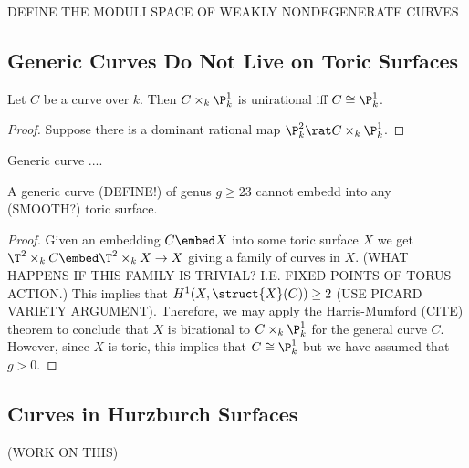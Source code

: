 \documentclass[12pt]{article}
\begin{document}
DEFINE THE MODULI SPACE OF WEAKLY NONDEGENERATE CURVES

\subsection{Generic Curves Do Not Live on Toric Surfaces}

\begin{lemma}
Let $C$ be a curve over $k$. Then $C \times_k \P^1_k$ is unirational iff $C \cong \P^1_k$.
\end{lemma}

\begin{proof}
Suppose there is a dominant rational map $\P^2_k \rat C \times_k \P^1_k$. 
\end{proof}

\begin{theorem}
Generic curve .... 
\end{theorem}

\begin{theorem}
A generic curve (DEFINE!) of genus $g \ge 23$ cannot embedd into any (SMOOTH?) toric surface. 
\end{theorem}

\begin{proof}
Given an embedding $C \embed X$ into some toric surface $X$ we get $\T^2 \times_k C \embed \T^2  \times_k X \to X$ giving a family of curves in $X$. (WHAT HAPPENS IF THIS FAMILY IS TRIVIAL? I.E. FIXED POINTS OF TORUS ACTION.) 
This implies that $H^1(X, \struct{X}(C)) \ge 2$ (USE PICARD VARIETY ARGUMENT). Therefore, we may apply the Harris-Mumford (CITE) theorem to conclude that $X$ is birational to $C \times_k \P^1_k$ for the general curve $C$. However, since $X$ is toric, this implies that $C \cong \P^1_k$ but we have assumed that $g > 0$. 
\end{proof}

\subsection{Curves in Hurzburch Surfaces}

(WORK ON THIS)
\end{document}
